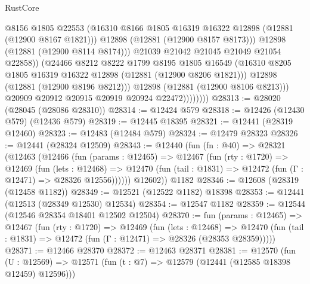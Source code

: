 \begin{lexlean}{RustCore}
\begin{coremodule}
                              @8156
                              @1805
                              @22553
                              (@16310
                                @8166
                                @1805
                                @16319
                                @16322
                                @12898
                                (@12881 (@12900 @8167 @1821)))
                              @12898
                              (@12881 (@12900 @8157 @8173)))
                            @12898
                            (@12881 (@12900 @8114 @8174)))
                          @21039
                          @21042
                          @21045
                          @21049
                          @21054
                          @22858))
                      (@24466
                        @8212
                        @8222
                        @1799
                        @8195
                        @1805
                        @16549
                        (@16310 @8205 @1805 @16319 @16322 @12898 (@12881 (@12900 @8206 @1821)))
                        @12898
                        (@12881 (@12900 @8196 @8212)))
                      @12898
                      (@12881 (@12900 @8106 @8213)))
                    @20909
                    @20912
                    @20915
                    @20919
                    @20924
                    @22472))))))))
@28313 := @28020 (@28045 (@28086 @28310))
@28314 := @12424 @579
@28318 := @12426 (@12430 @579) (@12436 @579)
@28319 := @12445 @18395
@28321 := @12441 (@28319 @12460)
@28323 := @12483 (@12484 @579)
@28324 := @12479 @28323
@28326 := @12441 (@28324 @12509)
@28343 := @12440
    (fun (fn : @40) =>
    @28321
      (@12463
        (@12466
          (fun (params : @12465) =>
          @12467
            (fun (rty : @1720) =>
            @12469
              (fun (lets : @12468) =>
              @12470 (fun (tail : @1831) => @12472 (fun (Γ : @12471) => @28326 @12556))))))
        @12602))
    @1182
@28346 := @12608 (@28319 (@12458 @1182))
@28349 := @12521 (@12522 @1182) @18398
@28353 := @12441 (@12513 (@28349 @12530) @12534)
@28354 := @12547 @1182
@28359 := @12544 (@12546 @28354 @18401 @12502 @12504)
@28370 := fun (params : @12465) =>
  @12467
    (fun (rty : @1720) =>
    @12469
      (fun (lets : @12468) =>
      @12470 (fun (tail : @1831) => @12472 (fun (Γ : @12471) => @28326 (@28353 @28359)))))
@28371 := @12466 @28370
@28372 := @12463 @28371
@28381 := @12570
    (fun (U : @12569) => @12571 (fun (t : @7) => @12579 (@12441 (@12585 @18398 @12459) @12596)))

\end{coremodule}
\end{lexlean}
